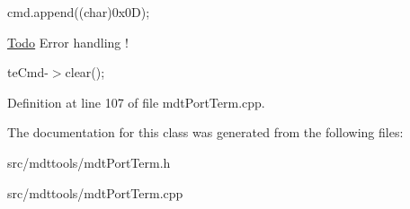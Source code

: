 cmd.append((char)0x0D);

\begin{Desc}
\item[\hyperlink{todo__todo000051}{Todo}]Error handling ! \end{Desc}


teCmd-\/$>$clear(); 



Definition at line 107 of file mdtPortTerm.cpp.



The documentation for this class was generated from the following files:\begin{DoxyCompactItemize}
\item 
src/mdttools/mdtPortTerm.h\item 
src/mdttools/mdtPortTerm.cpp\end{DoxyCompactItemize}
